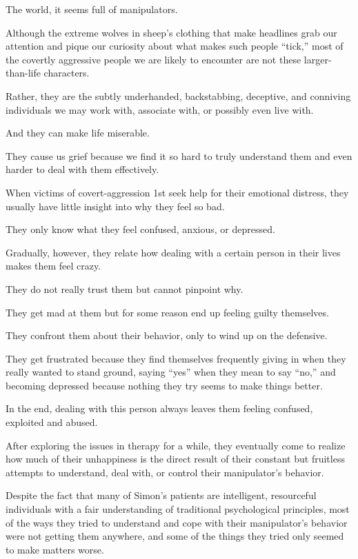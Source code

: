 \documentclass[oneside]{book}
\numberwithin{equation}{section}
\begin{document}
The world, it seems full of manipulators.

%
Although the extreme wolves in sheep's clothing that make headlines grab our attention and pique our curiosity about what makes such people ``tick,'' most of the covertly aggressive people we are likely to encounter are not these larger-than-life characters.

Rather, they are the subtly underhanded, backstabbing, deceptive, and conniving individuals we may work with, associate with, or possibly even live with.

And they can make life miserable.

They cause us grief because we find it so hard to truly understand them and even harder to deal with them effectively.

%
When victims of covert-aggression 1st seek help for their emotional distress, they usually have little insight into why they feel so bad.

They only know what they feel confused, anxious, or depressed.

Gradually, however, they relate how dealing with a certain person in their lives makes them feel crazy.

They do not really trust them but cannot pinpoint why.

They get mad at them but for some reason end up feeling guilty themselves.

They confront them about their behavior, only to wind up on the defensive.

They get frustrated because they find themselves frequently giving in when they really wanted to stand ground, saying ``yes'' when they mean to say ``no,'' and becoming depressed because nothing they try seems to make things better.

In the end, dealing with this person always leaves them feeling confused, exploited and abused.

After exploring the issues in therapy for a while, they eventually come to realize how much of their unhappiness is the direct result of their constant but fruitless attempts to understand, deal with, or control their manipulator's behavior.

%
Despite the fact that many of Simon's patients are intelligent, resourceful individuals with a fair understanding of traditional psychological principles, most of the ways they tried to understand and cope with their manipulator's behavior were not getting them anywhere, and some of the things they tried only seemed to make matters worse.
\end{document}
